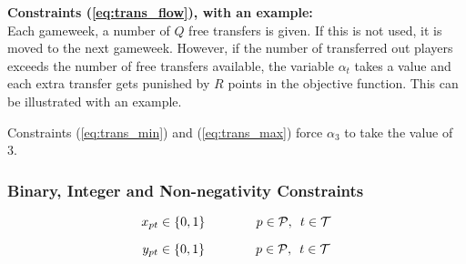 \newpar
\textbf{Constraints (\ref{eq:trans_flow}), with an example:}  \\ 

Each gameweek, a number of $Q$ free transfers is given. If this is not used, it is moved to the next gameweek. However, if the number of transferred out players exceeds the number of free transfers available, the variable $\alpha_{t}$ takes a value and each extra transfer gets punished by $R$ points in the objective function. This can be illustrated with an example. 

\begin{table}[H]
\centering
{}
\end{table}

Constraints (\ref{eq:trans_min}) and (\ref{eq:trans_max}) force $\alpha_{3}$ to take the value of 3. 

\subsubsection{Binary, Integer and Non-negativity Constraints}

\begin{equation} \label{eq:bin_x}
    x_{pt} \in \{0,1\} \qquad\qquad p \in \mathcal{P}, \enskip t \in \mathcal{T}
\end{equation}

\begin{equation} \label{eq:bin_y}
    y_{pt} \in \{0,1\} \qquad\qquad p \in \mathcal{P}, \enskip t \in \mathcal{T}
\end{equation}

